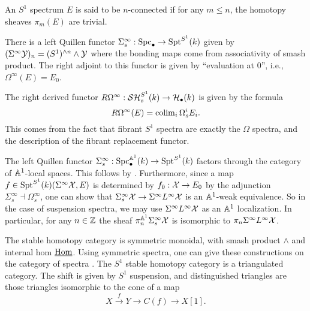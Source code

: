 \documentclass{amsart}%
\begin{document}
\begin{definition}
  An $S^1$ spectrum $E$ is said to be $n$-connected if for any
  $m\leq n$, the homotopy sheaves $\pi_m(E)$ are trivial.
\end{definition}

\begin{definition}
  There is a left Quillen functor
  $\Sigma^{\infty}_s : \mathrm{Spc}_{\bullet} \to \mathrm{Spt}^{S^1}(k)$ given by
  $(\Sigma^{\infty}\mathcal{Y})_n =(S^1)^{\wedge n} \wedge \mathcal{Y}$ where the
  bonding maps come from associativity of smash product. The right
  adjoint to this functor is given by ``evaluation at $0$'', i.e.,
  $\Omega^{\infty}(E) = E_0$.
\end{definition}

\begin{remark}
  The right derived functor
  $R\Omega^{\infty} : \mathcal{SH}^{S^1}_s(k) \to \mathcal{H}_{\bullet}(k)$ is given by
  the formula
  \begin{equation*}
    R\Omega^{\infty}(E) = \operatorname{colim}_i \Omega_s^{i}E_i.
  \end{equation*}
  This comes from the fact that fibrant $S^1$ spectra are exactly the
  $\Omega$ spectra, and the description of the fibrant replacement
  functor. 
\end{remark}

\begin{remark}
  The left Quillen functor
  $ \Sigma^{\infty}_s : \mathrm{Spc}_{\bullet}^{\mathbb{A}^1}(k) \to \mathrm{Spt}^{S^1}(k)$
  factors through the category of $\mathbb{A}^1$-local spaces. This follows
  by \cite[Remark 4.1.3]{Mor05}. Furthermore, since a map
  $ f \in \mathrm{Spt}^{S^1}(k)(\Sigma^{\infty}\mathcal{X}, E)$ is determined by
  $f_0 : \mathcal{X} \to E_0$ by the adjunction
  $\Sigma^{\infty}_s \dashv \Omega^{\infty}_s$, one can show that
  $\Sigma^{\infty}_s \mathcal{X} \to \Sigma^{\infty}L^{\infty}\mathcal{X}$ is an
  $\mathbb{A}^1$-weak equivalence. So in the case of suspension spectra, we
  may use $\Sigma^{\infty}L^{\infty}\mathcal{X}$ as an $\mathbb{A}^1$
  localization. In particular, for any $n\in \mathbb{Z}$ the sheaf
  $\pi_n^{\mathbb{A}^1}\Sigma^{\infty}_s\mathcal{X}$ is isomorphic to
  $\pi_n\Sigma^{\infty}L^{\infty}\mathcal{X}$.
\end{remark}

\begin{remark}
  The stable homotopy category is symmetric monoidal, with smash
  product $\wedge$ and internal hom $\underline{\operatorname{Hom}}$. Using
  symmetric spectra, one can give these constructions on the category
  of spectra \cite{HSS}.  The $S^1$ stable homotopy category is a
  triangulated category. The shift is given by $S^1$ suspension, and
  distinguished triangles are those triangles isomorphic to the cone
  of a map
  \begin{equation*}
    X \xrightarrow{f} Y \to C(f) \to X[1].
  \end{equation*}
\end{remark}
\end{document}
